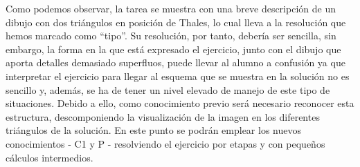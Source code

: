 		
		Como podemos observar, la tarea se muestra con una breve descripción de un dibujo con dos triángulos en posición de Thales, lo cual lleva a la resolución que hemos marcado como ``tipo''. Su resolución, por tanto, debería ser sencilla, sin embargo, la forma en la que está expresado el ejercicio, junto con el dibujo que aporta detalles demasiado superfluos, puede llevar al alumno a confusión ya que interpretar el ejercicio para llegar al esquema que se muestra en la solución no es sencillo y, además, se ha de tener un nivel elevado de manejo de este tipo de situaciones. Debido a ello, como conocimiento previo será necesario reconocer esta estructura, descomponiendo la visualización de la imagen en los diferentes triángulos de la solución. En este punto se podrán emplear los nuevos conocimientos - C1 y P - resolviendo el ejercicio por etapas y con pequeños cálculos intermedios.
		
	

